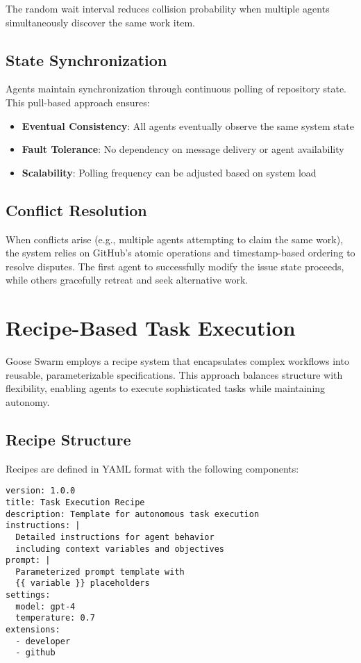 \documentclass[11pt,a4paper]{article}
\begin{document}
The random wait interval reduces collision probability when multiple agents simultaneously discover the same work item.

\subsection{State Synchronization}

Agents maintain synchronization through continuous polling of repository state. This pull-based approach ensures:

\begin{itemize}
    \item \textbf{Eventual Consistency}: All agents eventually observe the same system state
    \item \textbf{Fault Tolerance}: No dependency on message delivery or agent availability
    \item \textbf{Scalability}: Polling frequency can be adjusted based on system load
\end{itemize}

\subsection{Conflict Resolution}

When conflicts arise (e.g., multiple agents attempting to claim the same work), the system relies on GitHub's atomic operations and timestamp-based ordering to resolve disputes. The first agent to successfully modify the issue state proceeds, while others gracefully retreat and seek alternative work.

\section{Recipe-Based Task Execution}

Goose Swarm employs a recipe system that encapsulates complex workflows into reusable, parameterizable specifications. This approach balances structure with flexibility, enabling agents to execute sophisticated tasks while maintaining autonomy.

\subsection{Recipe Structure}

Recipes are defined in YAML format with the following components:

\begin{lstlisting}[caption=Recipe Structure Example]
version: 1.0.0
title: Task Execution Recipe
description: Template for autonomous task execution
instructions: |
  Detailed instructions for agent behavior
  including context variables and objectives
prompt: |
  Parameterized prompt template with
  {{ variable }} placeholders
settings:
  model: gpt-4
  temperature: 0.7
extensions:
  - developer
  - github
\end{lstlisting}
\end{document}

